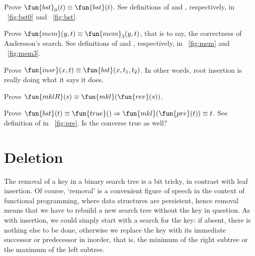 \begin{enumerate*}

  \item Prove \(\fun{bst}_0(t) \equiv \fun{bst}(t)\). See definitions of
   and
  , respectively, in
  \fig~\vref{fig:bst0} and \fig~\vref{fig:bst}.

  \item Prove \(\fun{mem}(y,t) \equiv \fun{mem}_3(y,t)\), that is to
  say, the correctness of Andersson's search. See definitions of
   and
  , respectively, in
  \fig~\vref{fig:mem} and \fig~\vref{fig:mem3}.

  \item Prove \(\fun{insr}(x,t) \equiv \fun{bst}(x,t_1,t_2)\).
   In
    other words, root insertion is really doing what it says it does.

  \item Prove \(\fun{mklR}(s) \equiv \fun{mkl}(\fun{rev}(s))\).
     

  \item Prove \(\fun{bst}(t) \equiv \fun{true}() \Rightarrow
    \fun{mkl}(\fun{pre}(t)) \equiv t\). See definition of 
     in \fig~\vref{fig:pre}. Is the converse
    true as well?

\end{enumerate*}

\section{Deletion}

The removal of a key in a binary search tree is a bit tricky, in
contrast with leaf insertion. Of course, `removal' is a convenient
figure of speech in the context of functional programming, where data
structures are persistent, hence removal means that we have to rebuild
a new search tree without the key in question. As with insertion, we
could simply start with a search for the key: if absent, there is
nothing else to be done, otherwise we replace the key with its
immediate successor or predecessor in inorder, that is, the minimum of
the right subtree or the maximum of the left subtree.

